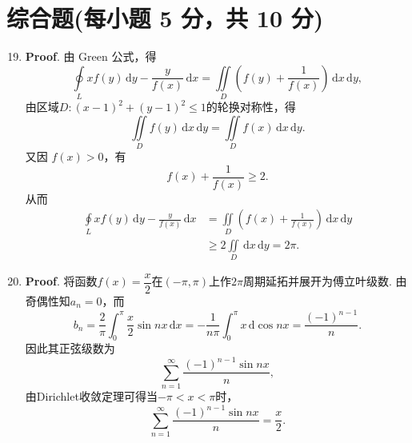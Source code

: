 \documentclass[../main.tex]{subfiles}
\begin{document}
\section{综合题(每小题 5 分，共 10 分)}
\begin{enumerate}
    \setcounter{enumi}{18}
    \item \textbf{Proof}. 由 Green 公式，得
          \[
              \oint\limits_{L}xf(y)\,\mathrm{d}y-\frac{y}{f(x)}\,\mathrm{d}x
              =\iint\limits_{D}\left(f(y)+\frac{1}{f(x)}\right)\,\mathrm{d}x\,\mathrm{d}y,
          \]
          由区域$D:(x-1)^{2}+(y-1)^{2}\le1$的轮换对称性，得
          \[
              \iint\limits_{D}f(y)\,\mathrm{d}x\,\mathrm{d}y=\iint\limits_{D}f(x)\,\mathrm{d}x\,\mathrm{d}y.
          \]
          又因 \(f(x)>0\)，有
          \[
              f(x)+\frac{1}{f(x)}\ge2.
          \]
          从而
          \[
              \begin{aligned}
                  \oint\limits_{L}xf(y)\,\mathrm{d}y-\frac{y}{f(x)}\,\mathrm{d}x
                   & =\iint\limits_D\left(f(x)+\frac1{f(x)}\right)\,\mathrm{d}x\,\mathrm{d}y \\
                   & \ge 2\iint\limits_D\,\mathrm{d}x\,\mathrm{d}y=2\pi.
              \end{aligned}
          \]

    \item \textbf{Proof}. 将函数$f(x)=\dfrac{x}{2}$在$(-\pi,\pi)$上作$2\pi$周期延拓并展开为傅立叶级数.
          由奇偶性知$a_{n}=0$，而
          \[
              b_{n}=\frac{2}{\pi}\int_{0}^{\pi}\frac{x}{2}\sin nx\,\mathrm{d}x=-\frac{1}{n\pi}\int_{0}^{\pi}x\,\mathrm{d}\cos nx = \frac{(-1)^{n-1}}{n}.
          \]
          因此其正弦级数为
          \[
              \sum_{n=1}^{\infty}\frac{(-1)^{n-1}\sin nx}{n},
          \]
          由Dirichlet收敛定理可得当$-\pi<x<\pi$时，
          \[
              \sum_{n=1}^{\infty}\frac{(-1)^{n-1}\sin nx}{n}=\frac{x}{2}.
          \]

\end{enumerate}
\end{document}
